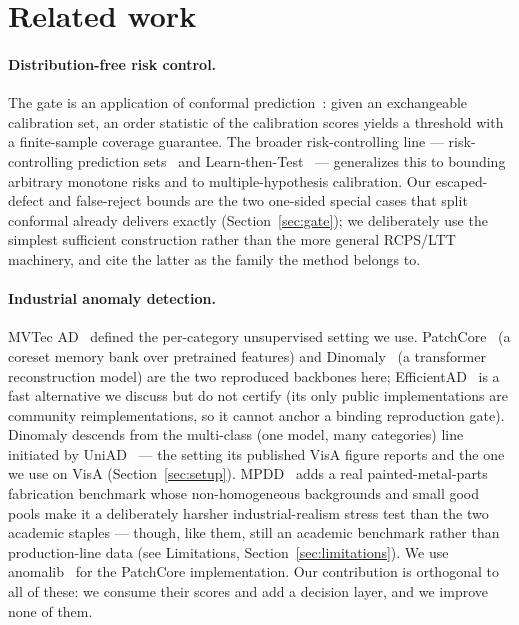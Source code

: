 \documentclass[11pt]{article}
\begin{document}
\section{Related work}
\label{sec:related}

\paragraph{Distribution-free risk control.} The gate is an application of conformal
prediction~\citep{vovk2005algorithmic,lei2018distribution,angelopoulos2023gentle}: given an
exchangeable calibration set, an order statistic of the calibration scores yields a threshold with
a finite-sample coverage guarantee. The broader risk-controlling line ---
risk-controlling prediction sets~\citep{bates2021rcps} and Learn-then-Test~\citep{angelopoulos2021ltt}
--- generalizes this to bounding arbitrary monotone risks and to multiple-hypothesis calibration.
Our escaped-defect and false-reject bounds are the two one-sided special cases that split conformal
already delivers exactly (Section~\ref{sec:gate}); we deliberately use the simplest sufficient
construction rather than the more general RCPS/LTT machinery, and cite the latter as the family the
method belongs to.

\paragraph{Industrial anomaly detection.} MVTec AD~\citep{bergmann2019mvtec} defined the
per-category unsupervised setting we use. PatchCore~\citep{roth2022patchcore} (a coreset memory bank
over pretrained features) and Dinomaly~\citep{guo2025dinomaly} (a transformer reconstruction model)
are the two reproduced backbones here; EfficientAD~\citep{batzner2024efficientad} is a fast
alternative we discuss but do not certify (its only public implementations are community
reimplementations, so it cannot anchor a binding reproduction gate). Dinomaly descends from the
multi-class (one model, many categories) line initiated by UniAD~\citep{you2022unified} --- the
setting its published VisA figure reports and the one we use on VisA
(Section~\ref{sec:setup}). MPDD~\citep{jezek2021mpdd} adds a real painted-metal-parts fabrication
benchmark whose non-homogeneous backgrounds and small good pools make it a deliberately harsher
industrial-realism stress test than the two academic staples --- though, like them, still an
academic benchmark rather than production-line data (see Limitations, Section~\ref{sec:limitations}).
We use
anomalib~\citep{akcay2022anomalib} for the PatchCore implementation. Our contribution is orthogonal
to all of these: we consume their scores and add a decision layer, and we improve none of them.
\end{document}
